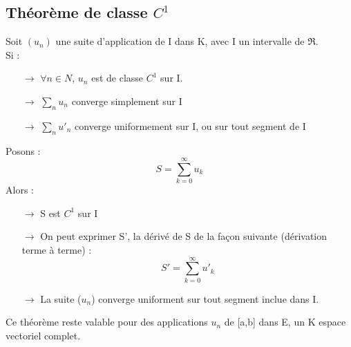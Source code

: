 \subsection{Théorème de classe $C^1$}
\begin{theo}
Soit $(u_n)$ une suite d'application de I dans K, avec I un intervalle de $\Re$.\\
Si : \\
\begin{itemize}
 \item[$\rightarrow$] $\forall n \in N$, $u_n$ est de classe $C^1$ sur I.\\
 \item[$\rightarrow$] $\underset{n} \sum u_n$ converge simplement sur I \\
 \item[$\rightarrow$] $\underset{n} \sum u'_n$ converge uniformement sur I, ou sur tout segment de I \\
\end{itemize}
Posons :
$$S = \sum_{k=0}^{\infty} u_k$$
Alors :\\
\begin{itemize}
 \item[$\rightarrow$] S est $C^1$ sur I\\
 \item[$\rightarrow$] On peut exprimer S', la dérivé de S de la façon suivante (dérivation terme à terme) : 
$$S' = \sum_{k=0}^{\infty} u'_k$$
 \item[$\rightarrow$] La suite ($u_n$) converge uniforment sur tout segment inclue dans I.
\end{itemize}
\end{theo}
\begin{gene}
Ce théorème reste valable pour des applications $u_n$ de [a,b] dans E, un K espace vectoriel complet.
\end{gene}
